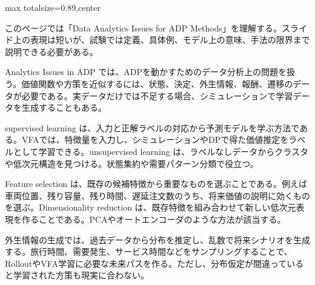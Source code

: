\begin{minipage}[t]{0.58\textwidth}
\begin{adjustbox}{max totalsize={\textwidth}{0.89\textheight},center}
\begin{minipage}{\textwidth}\scriptsize
{}このページでは「Data Analytics Issues for ADP Methods」を理解する。スライド上の表現は短いが、試験では定義、具体例、モデル上の意味、手法の限界まで説明できる必要がある。\par
Analytics Issues in ADP では、ADPを動かすためのデータ分析上の問題を扱う。価値関数や方策を近似するには、状態、決定、外生情報、報酬、遷移のデータが必要である。実データだけでは不足する場合、シミュレーションで学習データを生成することもある。\par
supervised learning は、入力と正解ラベルの対応から予測モデルを学ぶ方法である。VFAでは、特徴量を入力し、シミュレーションやDPで得た価値推定をラベルとして学習できる。unsupervised learning は、ラベルなしデータからクラスタや低次元構造を見つける。状態集約や需要パターン分類で役立つ。\par
Feature selection は、既存の候補特徴から重要なものを選ぶことである。例えば車両位置、残り容量、残り時間、遅延注文数のうち、将来価値の説明に効くものを選ぶ。Dimensionality reduction は、既存特徴を組み合わせて新しい低次元表現を作ることである。PCAやオートエンコーダのような方法が該当する。\par
外生情報の生成では、過去データから分布を推定し、乱数で将来シナリオを生成する。旅行時間、需要発生、サービス時間などをサンプリングすることで、RolloutやVFA学習に必要な未来パスを作る。ただし、分布仮定が間違っていると学習された方策も現実に合わない。\par

\end{minipage}
\end{adjustbox}
\end{minipage}
